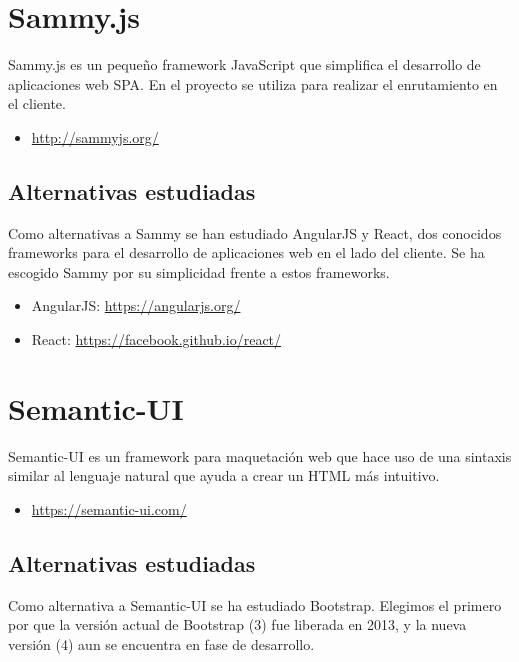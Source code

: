 \section{Sammy.js}

Sammy.js es un pequeño framework JavaScript que simplifica el desarrollo de aplicaciones web SPA.
En el proyecto se utiliza para realizar el enrutamiento en el cliente.

\begin{itemize}
	\item \url{http://sammyjs.org/}
\end{itemize}

\subsection{Alternativas estudiadas}

Como alternativas a Sammy se han estudiado AngularJS y React, dos conocidos frameworks para el desarrollo de aplicaciones web en el lado del cliente. Se ha escogido Sammy por su simplicidad frente a estos frameworks.

\begin{itemize}
	\item AngularJS: \url{https://angularjs.org/}
	\item React: \url{https://facebook.github.io/react/}
\end{itemize}

\section{Semantic-UI}

Semantic-UI es un framework para maquetación web que hace uso de una sintaxis similar al lenguaje natural que ayuda a crear un HTML más intuitivo.

\begin{itemize}
	\item \url{https://semantic-ui.com/}
\end{itemize}

\subsection{Alternativas estudiadas}

Como alternativa a Semantic-UI se ha estudiado Bootstrap. Elegimos el primero por que la versión actual de Bootstrap (3) fue liberada en 2013, y la nueva versión (4) aun se encuentra en fase de desarrollo.

